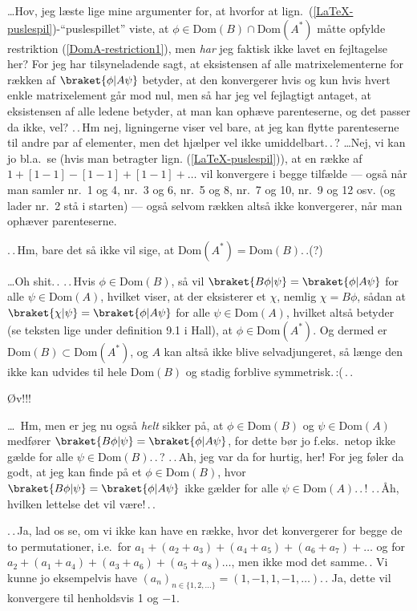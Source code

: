 \documentclass{report}
\begin{document}
\ldots Hov, jeg læste lige mine argumenter for, at hvorfor at lign.\ (\ref{LaTeX-puslespil})-``puslespillet'' viste, at $\phi \in \mathrm{Dom}(B) \cap \mathrm{Dom}(A^*)$ måtte opfylde restriktion (\ref{DomA-restriction1}), men \emph{har} jeg faktisk ikke lavet en fejltagelse her? For jeg har tilsyneladende sagt, at eksistensen af alle matrixelementerne for rækken af $\braket{\phi|A \psi}$ betyder, at den konvergerer hvis og kun hvis hvert enkle matrixelement går mod nul, men så har jeg vel fejlagtigt antaget, at eksistensen af alle ledene betyder, at man kan ophæve parenteserne, og det passer da ikke, vel? .\,.\,Hm nej, ligningerne viser vel bare, at jeg kan flytte parenteserne til andre par af elementer, men det hjælper vel ikke umiddelbart.\,.\,? 
\ldots Nej, vi kan jo bl.a.\ se (hvis man betragter lign. (\ref{LaTeX-puslespil})), at en række af $1 + [1 - 1] - [1 - 1] + [1 - 1] + \ldots$ vil konvergere i begge tilfælde --- også når man samler nr.\ 1 og 4, nr.\ 3 og 6, nr.\ 5 og 8, nr.\ 7 og 10, nr.\ 9 og 12 osv. (og lader nr.\ 2 stå i starten) --- også selvom rækken altså ikke konvergerer, når man ophæver parenteserne.  

.\,.\,Hm, bare det så ikke vil sige, at $\mathrm{Dom}(A^*) = \mathrm{Dom}(B)$.\,.(?) 

\ldots Oh shit.\,. .\,.\,Hvis $\phi\in\mathrm{Dom}(B)$, så vil $\braket{B\phi | \psi} = \braket{\phi | A \psi}$ for alle $\psi\in\mathrm{Dom}(A)$, hvilket viser, at der eksisterer et $\chi$, nemlig $\chi=B \phi$, sådan at $\braket{\chi | \psi} = \braket{\phi | A \psi}$ for alle $\psi\in\mathrm{Dom}(A)$, hvilket altså betyder (se teksten lige under definition 9.1 i Hall), at $\phi\in\mathrm{Dom}(A^*)$. Og dermed er $\mathrm{Dom}(B) \subset \mathrm{Dom}(A^*)$, og $A$ kan altså ikke blive selvadjungeret, så længe den ikke kan udvides til hele Dom$(B)$ og stadig forblive symmetrisk.\,:(\,.\,. 

Øv!!!


\ldots\ Hm, men er jeg nu også \emph{helt} sikker på, at $\phi\in\mathrm{Dom}(B)$ og $\psi\in\mathrm{Dom}(A)$ medfører $\braket{B\phi | \psi} = \braket{\phi | A \psi}$, for dette bør jo f.eks.\ netop ikke gælde for alle $\psi\in\mathrm{Dom}(B)$.\,.\,? .\,.\,Ah, jeg var da for hurtig, her! For jeg føler da godt, at jeg kan finde på et $\phi\in\mathrm{Dom}(B)$, hvor $\braket{B\phi | \psi} = \braket{\phi | A \psi}$ ikke gælder for alle $\psi\in\mathrm{Dom}(A)$.\,.\,! .\,.\,Åh, hvilken lettelse det vil være!\,.\,. 

.\,.\,Ja, lad os se, om vi ikke kan have en række, hvor det konvergerer for begge de to permutationer, i.e.\ for $a_1 + (a_2 + a_3) + (a_4 + a_5) + (a_6 + a_7) + \ldots$ og for $a_2 + (a_1 + a_4) + (a_3 + a_6) + (a_5 + a_8) \ldots$, men ikke mod det samme.\,. Vi kunne jo eksempelvis have $(a_n)_{n\in\{1, 2, \ldots\}} = (1, -1, 1, -1, \ldots)$.\,. Ja, dette vil konvergere til henholdsvis 1 og $-1$. 
\end{document}
